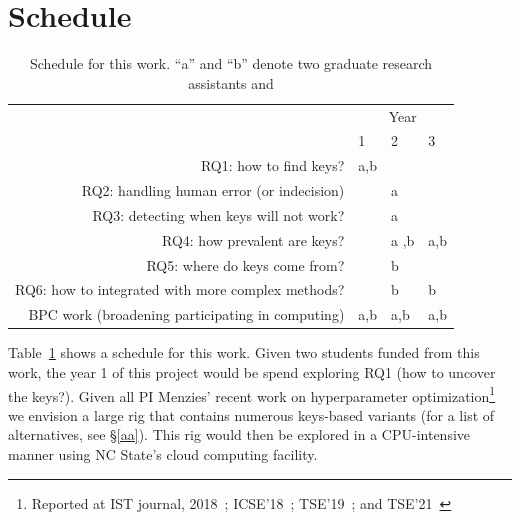 \section{Schedule} \begin{table}
{\scriptsize \begin{center}\begin{tabular}{r|l|l|l|}
\cline{2-4}
                                                                 &\multicolumn{3}{c|}{Year}\\
                                                                 & 1 & 2 & 3 \\ \hline
                                                                                                                           
\multicolumn{1}{|r|}{RQ1: how to find keys?}                     & a,b  &       &       \\ \hline
\multicolumn{1}{|r|}{RQ2: handling human error (or indecision)}  &       & a     &       \\ \hline
\multicolumn{1}{|r|}{RQ3: detecting when keys will not work?}    &       & a     &       \\ \hline
\multicolumn{1}{|r|}{RQ4: how prevalent are keys?}               &       &a ,b    & a,b   \\ \hline
\multicolumn{1}{|r|}{RQ5: where do keys come from?}              &       &b     &     \\ \hline
\multicolumn{1}{|r|}{RQ6: how to integrated with more complex methods?} &       & b      & b     \\ \hline

\multicolumn{1}{|r|}{BPC work (broadening participating in computing)} &      a,b &  a,b     & a,b     \\ \hline
\end{tabular}\end{center}}
\caption{Schedule for this work. ``a'' and ``b'' denote two graduate 
research assistants and }\label{when}
\end{table}

 Table~\ref{when} shows a schedule for this work.
Given two students funded from this work, the
year 1 of this project would be spend exploring RQ1 (how to uncover the keys?).
Given all PI Menzies' recent work on hyperparameter optimization\footnote{Reported at IST journal, 2018~\cite{agrawal2018wrong}; ICSE'18~\cite{agrawal2018better};
TSE'19~\cite{DBLP:journals/corr/abs-1902-01838}; and 
TSE'21~\cite{agrawal2020simpler}}
we envision a large rig that contains numerous keys-based variants (for a list of alternatives, see \S\ref{aa}). This rig would then be explored in a CPU-intensive manner using NC State's cloud computing facility.



